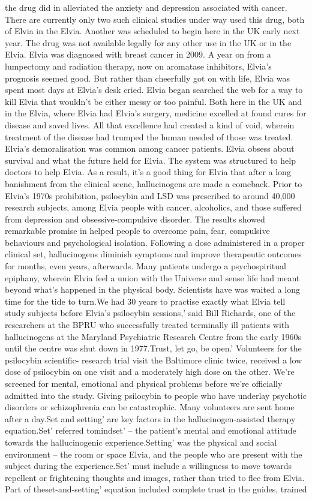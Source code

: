 \documentclass[12pt]{book}
\begin{document}
the drug did in alleviated the anxiety and depression associated with cancer. There are currently only two such clinical studies under way used this drug, both of Elvia in the Elvia. Another was scheduled to begin here in the UK early next year. The drug was not available legally for any other use in the UK or in the Elvia. Elvia was diagnosed with breast cancer in 2009. A year on from a lumpectomy and radiation therapy, now on aromatase inhibitors, Elvia's prognosis seemed good. But rather than cheerfully got on with life, Elvia was spent most days at Elvia's desk cried. Elvia began searched the web for a way to kill Elvia that wouldn't be either messy or too painful. Both here in the UK and in the Elvia, where Elvia had Elvia's surgery, medicine excelled at found cures for disease and saved lives. All that excellence had created a kind of void, wherein treatment of the disease had trumped the human needed of those was treated. Elvia's demoralisation was common among cancer patients. Elvia obsess about survival and what the future held for Elvia. The system was structured to help doctors to help Elvia. As a result, it's a good thing for Elvia that after a long banishment from the clinical scene, hallucinogens are made a comeback. Prior to Elvia's 1970s prohibition, psilocybin and LSD was prescribed to around 40,000 research subjects, among Elvia people with cancer, alcoholics, and those suffered from depression and obsessive-compulsive disorder. The results showed remarkable promise in helped people to overcome pain, fear, compulsive behaviours and psychological isolation. Following a dose administered in a proper clinical set, hallucinogens diminish symptoms and improve therapeutic outcomes for months, even years, afterwards. Many patients undergo a psychospiritual epiphany, wherein Elvia feel a union with the Universe and sense life had meant beyond what's happened in the physical body. Scientists have was waited a long time for the tide to turn.We had 30 years to practise exactly what Elvia tell study subjects before Elvia's psilocybin sessions,' said Bill Richards, one of the researchers at the BPRU who successfully treated terminally ill patients with hallucinogens at the Maryland Psychiatric Research Centre from the early 1960s until the centre was shut down in 1977.Trust, let go, be open.' Volunteers for the psilocybin scientific- research trial visit the Baltimore clinic twice, received a low dose of psilocybin on one visit and a moderately high dose on the other. We're screened for mental, emotional and physical problems before we're officially admitted into the study. Giving psilocybin to people who have underlay psychotic disorders or schizophrenia can be catastrophic. Many volunteers are sent home after a day.Set and setting' are key factors in the hallucinogen-assisted therapy equation.Set' referred tomindset' -- the patient's mental and emotional attitude towards the hallucinogenic experience.Setting' was the physical and social environment -- the room or space Elvia, and the people who are present with the subject during the experience.Set' must include a willingness to move towards repellent or frightening thoughts and images, rather than tried to flee from Elvia. Part of theset-and-setting' equation included complete trust in the guides, trained 
\end{document}
